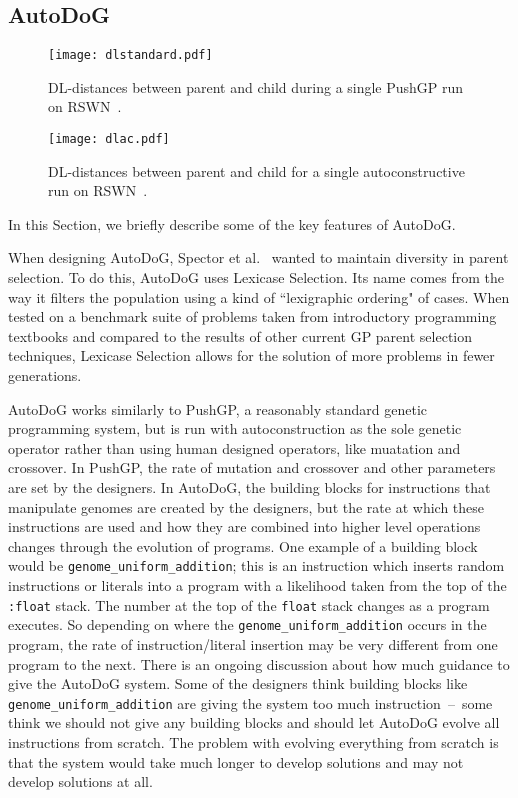 \documentclass{sig-alternate}
\begin{document}
\subsection{AutoDoG}
\label{sec:autodog}

\begin{figure*}
	\centering
	\begin{minipage}[b]{0.4\textwidth}
		\texttt{[image: dlstandard.pdf]}
		\caption{DL-distances between parent and child during a single PushGP run on RSWN~\cite{spector:2016}.}
		\label{fig:standard}
	\end{minipage}
	\hfill
	\begin{minipage}[b]{0.4\textwidth}
		\texttt{[image: dlac.pdf]}
		\caption{DL-distances between parent and child for a single autoconstructive run on RSWN~\cite{spector:2016}.}
		\label{fig:ac}
	\end{minipage}
\end{figure*}

In this Section, we briefly describe some of the key features of AutoDoG.

When designing AutoDoG, Spector et al.~\cite{spector:2016} wanted to maintain diversity in parent selection. To do this, AutoDoG uses Lexicase Selection. Its name comes from the way it filters the population using a kind of ``lexigraphic ordering" of cases. When tested on a benchmark suite of problems taken from introductory programming textbooks and compared to the results of other current GP parent selection techniques, Lexicase Selection allows for the solution of more problems in fewer generations.

AutoDoG works similarly to PushGP, a reasonably standard genetic programming system, but is run with autoconstruction as the sole genetic operator rather than using human designed operators, like muatation and crossover. In PushGP, the rate of mutation and crossover and other parameters are set by the designers. In AutoDoG, the building blocks for instructions that manipulate genomes are created by the designers, but the rate at which these instructions are used and how they are combined into higher level operations changes through the evolution of programs. One example of a building block would be  \texttt{genome\_uniform\_addition}; this is an instruction which inserts random instructions or literals into a program with a likelihood taken from the top of the \texttt{:float} stack. The number at the top of the \texttt{float} stack changes as a program executes. So depending on where the \texttt{genome\_uniform\_addition} occurs in the program, the rate of instruction/literal insertion may be very different from one program to the next. There is an ongoing discussion about how much guidance to give the AutoDoG system. Some of the designers think building blocks like \texttt{genome\_uniform\_addition} are giving the system too much instruction~--~some think we should not give any building blocks and should let AutoDoG evolve all instructions from scratch. The problem with evolving everything from scratch is that the system would take much longer to develop solutions and may not develop solutions at all.
\end{document}
